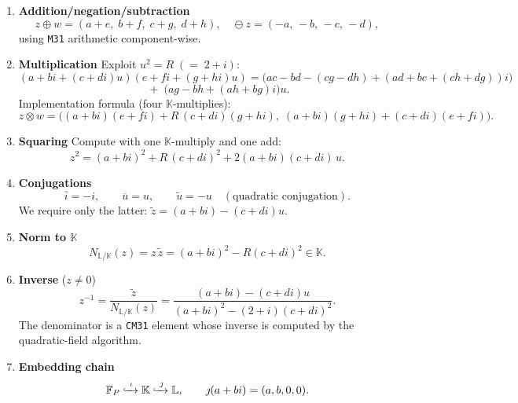 \documentclass{article}
\begin{document}
\begin{enumerate}[label=\textbf{O\arabic*}.]
\item \textbf{Addition/negation/subtraction}
      \[
        z\oplus w = (a+e,\;b+f,\;c+g,\;d+h),
      \quad
        \ominus z  = (-a,\,-b,\,-c,\,-d),
      \]
      using \texttt{M31} arithmetic component-wise.

\item \textbf{Multiplication}
      Exploit \(u^{2}=R\;(=\;2+i)\):
      \[
        (a+bi + (c+di)u)
        (e+fi + (g+hi)u)
        = \bigl(ac-bd - (cg-dh) + (ad+bc + (ch+dg))i\bigr)
      \]
      \vspace{-1.1\baselineskip}
      \[
        \qquad
        +\;
        \bigl(ag-bh + (ah+bg)i\bigr)u.
      \]
      Implementation formula (four \(\mathbb{K}\)-multiplies):
      \[
        z\otimes w =
        \bigl( (a+bi)(e+fi) + R\,(c+di)(g+hi),\;
               (a+bi)(g+hi) + (c+di)(e+fi) \bigr).
        \tag{$*$}
      \]

\item \textbf{Squaring}
      Compute with one \(\mathbb{K}\)-multiply and one add:
      \[
        z^{2} = (a+bi)^{2} + R\,(c+di)^{2}
                + 2(a+bi)(c+di)\,u.
      \]

\item \textbf{Conjugations}
      \[
        \overline{i}= -i,
        \qquad
        \overline{u}= u,
        \qquad
        \widetilde{u}= -u
        \quad(\text{quadratic conjugation}).
      \]
      We require only the latter:
      \(\tilde{z}=(a+bi)-(c+di)u\).

\item \textbf{Norm to \(\mathbb{K}\)}
      \[
        N_{\mathbb{L}/\mathbb{K}}(z)
        = z\,\tilde{z}
        = (a+bi)^{2}-R(c+di)^{2}\in\mathbb{K}.
      \]

\item \textbf{Inverse}  (\(z\neq0\))
      \[
        z^{-1}
        =\frac{\tilde{z}}{N_{\mathbb{L}/\mathbb{K}}(z)}
        = \frac{(a+bi) - (c+di)u}
               {(a+bi)^{2} - (2+i)(c+di)^{2}}.
      \]
      The denominator is a \texttt{CM31} element whose inverse
      is computed by the quadratic-field algorithm.

\item \textbf{Embedding chain}
      \[
        \mathbb{F}_{P}\xhookrightarrow{\;\iota\;}
        \mathbb{K}\xhookrightarrow{\;\jmath\;}
        \mathbb{L},
        \qquad
        \jmath(a+bi)=(a,b,0,0).
      \]
\end{enumerate}
\end{document}
